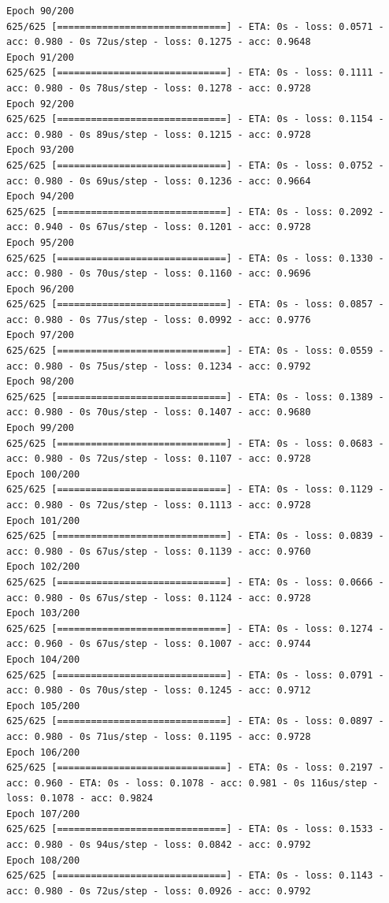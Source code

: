 \documentclass[11pt]{article}
\begin{document}
\begin{Verbatim}[commandchars=\\\{\}]
Epoch 90/200
625/625 [==============================] - ETA: 0s - loss: 0.0571 - acc: 0.980 - 0s 72us/step - loss: 0.1275 - acc: 0.9648
Epoch 91/200
625/625 [==============================] - ETA: 0s - loss: 0.1111 - acc: 0.980 - 0s 78us/step - loss: 0.1278 - acc: 0.9728
Epoch 92/200
625/625 [==============================] - ETA: 0s - loss: 0.1154 - acc: 0.980 - 0s 89us/step - loss: 0.1215 - acc: 0.9728
Epoch 93/200
625/625 [==============================] - ETA: 0s - loss: 0.0752 - acc: 0.980 - 0s 69us/step - loss: 0.1236 - acc: 0.9664
Epoch 94/200
625/625 [==============================] - ETA: 0s - loss: 0.2092 - acc: 0.940 - 0s 67us/step - loss: 0.1201 - acc: 0.9728
Epoch 95/200
625/625 [==============================] - ETA: 0s - loss: 0.1330 - acc: 0.980 - 0s 70us/step - loss: 0.1160 - acc: 0.9696
Epoch 96/200
625/625 [==============================] - ETA: 0s - loss: 0.0857 - acc: 0.980 - 0s 77us/step - loss: 0.0992 - acc: 0.9776
Epoch 97/200
625/625 [==============================] - ETA: 0s - loss: 0.0559 - acc: 0.980 - 0s 75us/step - loss: 0.1234 - acc: 0.9792
Epoch 98/200
625/625 [==============================] - ETA: 0s - loss: 0.1389 - acc: 0.980 - 0s 70us/step - loss: 0.1407 - acc: 0.9680
Epoch 99/200
625/625 [==============================] - ETA: 0s - loss: 0.0683 - acc: 0.980 - 0s 72us/step - loss: 0.1107 - acc: 0.9728
Epoch 100/200
625/625 [==============================] - ETA: 0s - loss: 0.1129 - acc: 0.980 - 0s 72us/step - loss: 0.1113 - acc: 0.9728
Epoch 101/200
625/625 [==============================] - ETA: 0s - loss: 0.0839 - acc: 0.980 - 0s 67us/step - loss: 0.1139 - acc: 0.9760
Epoch 102/200
625/625 [==============================] - ETA: 0s - loss: 0.0666 - acc: 0.980 - 0s 67us/step - loss: 0.1124 - acc: 0.9728
Epoch 103/200
625/625 [==============================] - ETA: 0s - loss: 0.1274 - acc: 0.960 - 0s 67us/step - loss: 0.1007 - acc: 0.9744
Epoch 104/200
625/625 [==============================] - ETA: 0s - loss: 0.0791 - acc: 0.980 - 0s 70us/step - loss: 0.1245 - acc: 0.9712
Epoch 105/200
625/625 [==============================] - ETA: 0s - loss: 0.0897 - acc: 0.980 - 0s 71us/step - loss: 0.1195 - acc: 0.9728
Epoch 106/200
625/625 [==============================] - ETA: 0s - loss: 0.2197 - acc: 0.960 - ETA: 0s - loss: 0.1078 - acc: 0.981 - 0s 116us/step - loss: 0.1078 - acc: 0.9824
Epoch 107/200
625/625 [==============================] - ETA: 0s - loss: 0.1533 - acc: 0.980 - 0s 94us/step - loss: 0.0842 - acc: 0.9792
Epoch 108/200
625/625 [==============================] - ETA: 0s - loss: 0.1143 - acc: 0.980 - 0s 72us/step - loss: 0.0926 - acc: 0.9792

\end{Verbatim}
\end{document}
